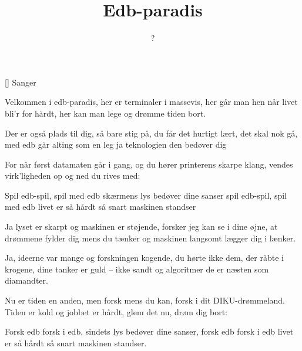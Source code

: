 \documentclass[a4paper,11pt]{article}
\title{Edb-paradis}
\author{?}
\begin{document}
\maketitle

\begin{roles}
[] Sanger
\end{roles}

\begin{song}
 Velkommen i edb-paradis,
          her er terminaler i massevis,
          her går man hen når livet bli'r for hårdt,
          her kan man lege og drømme tiden bort.

 Der er også plads til dig, så bare stig på,
          du får det hurtigt lært, det skal nok gå,
          med edb går alting som en leg
          ja teknologien den bedøver dig

 For når først datamaten går i gang,
          og du hører printerens skarpe klang,
          vendes virk'ligheden op og ned
          du rives med:

 Spil edb-spil, spil med edb
          skærmens lys bedøver dine sanser
          spil edb-spil, spil med edb
          livet er så hårdt så snart maskinen standser

 Ja lyset er skarpt og maskinen er støjende,
          forsker jeg kan se i dine øjne,
          at drømmene fylder dig mens du tænker
          og maskinen langsomt lægger dig i lænker.

 Ja, ideerne var mange og forskningen kogende,
          du hørte ikke dem, der råbte i krogene,
          dine tanker er guld -- ikke sandt
          og algoritmer de er næsten som diamandter.

 Nu er tiden en anden, men forsk mens du kan,
          forsk i dit DIKU-drømmeland.
          Tiden er kold og jobbet er hårdt,
          glem det nu, drøm dig bort:

 Forsk edb forsk i edb,
          sindets lys bedøver dine sanser,
          forsk edb forsk i edb
          livet er så hårdt så snart maskinen standser.
\end{song}
\end{document}
